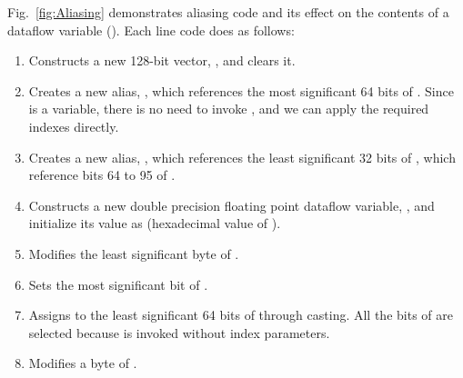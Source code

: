 Fig.~\ref{fig:Aliasing} demonstrates aliasing code and its effect on the contents of a dataflow variable (). Each line code does as follows:
\begin{enumerate}
  \item Constructs a new 128-bit vector, , and clears it.
  \item Creates a new alias, , which references the most significant 64 bits of . Since  is a  variable, there is no need to invoke , and we can apply the required indexes directly.
  \item Creates a new alias, , which references the least significant 32 bits of , which reference bits 64 to 95 of .
  \item Constructs a new double precision floating point dataflow variable, , and initialize its value as  (hexadecimal value of ).
  \item Modifies the least significant byte of .
  \item Sets the most significant bit of .
  \item Assigns  to the least significant 64 bits of  through casting. All the bits of  are selected because  is invoked without index parameters.
  \item Modifies a byte of .
  
\end{enumerate}



